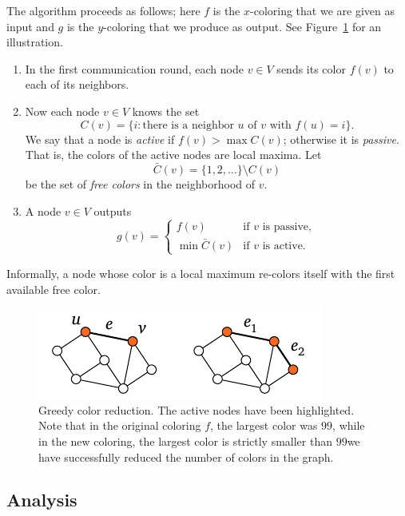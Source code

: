 The algorithm proceeds as follows; here $f$ is the $x$-coloring that we are given as input and $g$ is the $y$-coloring that we produce as output. See Figure~\ref{fig:greedy} for an illustration.
\begin{enumerate}
    \item In the first communication round, each node $v \in V$ sends its color $f(v)$ to each of its neighbors.
    \item Now each node $v \in V$ knows the set
    \[
        C(v) = \{ i : \text{there is a neighbor $u$ of $v$ with $f(u) = i$} \}.
    \]
    We say that a node is \emph{active} if $f(v) > \max C(v)$; otherwise it is \emph{passive}. That is, the colors of the active nodes are local maxima. Let
    \[
        \bar{C}(v) = \{1,2,\dotsc\} \setminus C(v)
    \]
    be the set of \emph{free colors} in the neighborhood of $v$.
    \item A node $v \in V$ outputs
    \[
        g(v) = \begin{cases}
            f(v) & \text{if $v$ is passive}, \\
            \min \bar{C}(v) & \text{if $v$ is active}.
        \end{cases}
    \]
\end{enumerate}
Informally, a node whose color is a local maximum re-colors itself with the first available free color.

\begin{figure}
    \centering
    \includegraphics[page=\PGreedy]{figs.pdf}
    \caption{Greedy color reduction. The active nodes have been highlighted. Note that in the original coloring $f$, the largest color was $99$, while in the new coloring, the largest color is strictly smaller than $99$\mydash we have successfully reduced the number of colors in the graph.}\label{fig:greedy}
\end{figure}

\subsection{Analysis}

